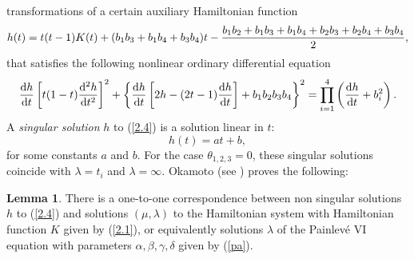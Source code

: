 \documentclass[12pt]{article}
\theoremstyle{definition}
\theoremstyle{theorem}
\newtheorem{lm}[df]{Lemma}
\begin{document}
transformations of a certain auxiliary Hamiltonian function
$$
h(t)=t(t-1)K(t)+(b_1 b_3+b_1 b_4 + b_3 b_4) t -
{b_1 b_2 + b_1 b_3+b_1 b_4 +b_2 b_3+b_2 b_4 + b_3 b_4\over 2},\label{2.3}
$$
that satisfies the following nonlinear ordinary
differential equation
\begin{equation}
{{\rm d} h\over{\rm d} t}
\left[t(1-t){{\rm d}^2 h\over{\rm d} t^2}\right]^2+
\left\{{{\rm d} h\over{\rm d} t}
\left[2 h-(2t-1){{\rm d} h\over{\rm d} t}\right]+ b_1 b_2 b_3 b_4\right\}^2
=\prod_{i=1}^4 \left({{\rm d} h\over{\rm d} t}+b_i^2 \right).
\label{2.4}
\end{equation}
A {\it singular solution}\/ $h$ to (\ref{2.4}) is a solution linear in $t$:
$$
h(t)= a t +b,
$$
for some constants $a$ and $b$. For the case $\theta_{1,2,3}=0$, these
singular solutions coincide with $\lambda=t_i$ and $\lambda=\infty$. Okamoto 
(see \cite{Ok2})
proves the following:
 
\begin{lm} There is a one-to-one correspondence between non
singular solutions $h$ to (\ref{2.4}) and solutions $(\mu,\lambda)$ to the
Hamiltonian system with Hamiltonian function $K$ given by (\ref{2.1}),
or equivalently solutions $\lambda$ of the Painlev\'e VI equation with 
parameters $\alpha,\beta,\gamma,\delta$ given by (\ref{pa}).
\end{lm}
 
\end{document}
